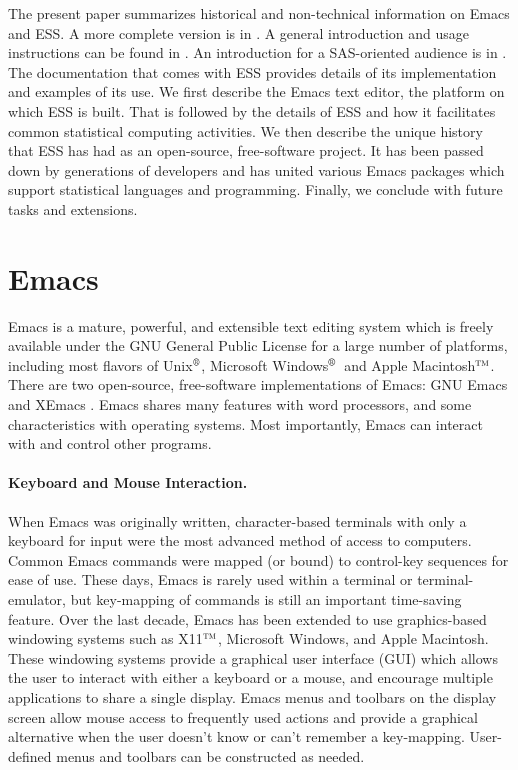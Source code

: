 \documentclass{article}
\newcommand*{\regstrd}{$^{\mbox{\scriptsize\textregistered}}$}
\newcommand*{\tm}{$^{\mbox{\scriptsize\sc tm}}$}
\begin{document}
The present paper summarizes historical and non-technical information on
Emacs and ESS.  A more complete version is in \citep{RMHHS:2001}.
A general introduction and usage instructions can be
found in \citep{heiberger:dsc:2001}.
An introduction for a SAS-oriented audience is in
\citep{heiberger:philasugi:2001}.  The documentation that comes with
ESS provides details of its implementation and examples of its use.
We first describe the Emacs text editor, the platform on which ESS is
built.  That is followed by the details of ESS and how it facilitates
common statistical computing activities.  We then describe the unique
history that ESS has had as an open-source, free-software project.
It has been passed down by generations of developers and has
united various Emacs packages which support
statistical languages and programming.  Finally, we conclude with
future tasks and extensions.

\section{Emacs}
\label{sec:emacs}

Emacs is a mature, powerful, and extensible text editing system which
is freely available under the GNU General Public License for a large
number of platforms, including most flavors of Unix\regstrd, Microsoft Windows\regstrd\
and Apple Macintosh\tm.  There are two open-source, free-software
implementations of Emacs:  GNU Emacs \citep{GNU-Emacs} and XEmacs
\citep{XEmacs}.  Emacs shares many features with
word processors, and some characteristics with operating systems.
Most importantly, Emacs can interact with and control other programs.

\paragraph{Keyboard and Mouse Interaction.}
When Emacs was originally written, character-based terminals with only
a keyboard for input were the most advanced method of access to
computers.  Common Emacs commands were mapped (or bound) to control-key
sequences for ease of use.  These days, Emacs is
rarely used within a terminal or terminal-emulator, but key-mapping of
commands is still an important time-saving feature.  Over the last
decade, Emacs has been extended to use graphics-based windowing
systems such as X11\tm, Microsoft Windows, and Apple Macintosh.  These
windowing systems provide a graphical user interface (GUI) which
allows the user to interact with either a keyboard or a mouse, and encourage
multiple applications to share a single display.  Emacs menus and
toolbars on the display screen allow mouse access to frequently used
actions and provide a graphical alternative
when the user doesn't know or can't remember a key-mapping.  User-defined
menus and toolbars can be constructed as needed.
\end{document}
